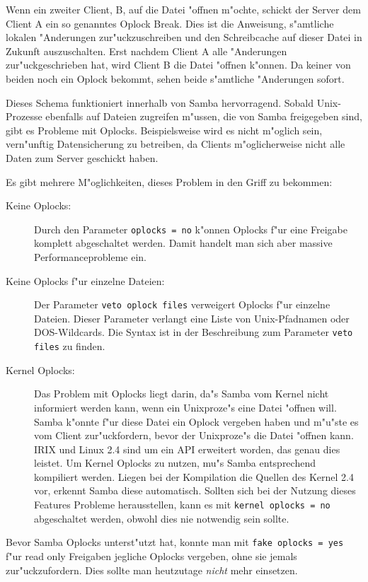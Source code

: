 \documentclass{scrartcl}\usepackage{pslatex}\typearea{12}
\newcommand{\param}{\texttt}
\begin{document}
Wenn ein zweiter Client, B, auf die Datei "offnen m"ochte, schickt der
Server dem Client A ein so genanntes Oplock Break. Dies ist die
Anweisung, s"amtliche lokalen "Anderungen zur"uckzuschreiben und den
Schreibcache auf dieser Datei in Zukunft auszuschalten. Erst nachdem
Client A alle "Anderungen zur"uckgeschrieben hat, wird Client B die
Datei "offnen k"onnen. Da keiner von beiden noch ein Oplock bekommt,
sehen beide s"amtliche "Anderungen sofort.

Dieses Schema funktioniert innerhalb von Samba hervorragend. Sobald
Unix-Prozesse ebenfalls auf Dateien zugreifen m"ussen, die von Samba
freigegeben sind, gibt es Probleme mit Oplocks. Beispielsweise wird es
nicht m"oglich sein, vern"unftig Datensicherung zu betreiben, da
Clients m"oglicherweise nicht alle Daten zum Server geschickt haben.

Es gibt mehrere M"oglichkeiten, dieses Problem in den Griff zu
bekommen:

\begin{description}
\item[Keine Oplocks:] Durch den Parameter \param{oplocks = no} k"onnen
  Oplocks f"ur eine Freigabe komplett abgeschaltet werden. Damit
  handelt man sich aber massive Performanceprobleme ein.
\item[Keine Oplocks f"ur einzelne Dateien:] Der Parameter \param{veto
    oplock files} verweigert Oplocks f"ur einzelne Dateien. Dieser
  Parameter verlangt eine Liste von Unix-Pfadnamen oder
  DOS-Wild\-cards. Die Syntax ist in der Beschreibung zum Parameter
  \param{veto files} zu finden.
\item[Kernel Oplocks:] Das Problem mit Oplocks liegt darin, da"s Samba
  vom Kernel nicht informiert werden kann, wenn ein Unixproze"s eine
  Datei "offnen will. Samba k"onnte f"ur diese Datei ein Oplock
  vergeben haben und m"u"ste es vom Client zur"uckfordern, bevor der
  Unixproze"s die Datei "offnen kann. IRIX und Linux 2.4 sind um ein
  API erweitert worden, das genau dies leistet. Um Kernel Oplocks zu
  nutzen, mu"s Samba entsprechend kompiliert werden. Liegen bei der
  Kompilation die Quellen des Kernel 2.4 vor, erkennt Samba diese
  automatisch. Sollten sich bei der Nutzung dieses Features Probleme
  herausstellen, kann es mit \param{kernel oplocks = no} abgeschaltet
  werden, obwohl dies nie notwendig sein sollte.
\end{description}

Bevor Samba Oplocks unterst"utzt hat, konnte man mit \param{fake
  oplocks = yes} f"ur read only Freigaben jegliche Oplocks vergeben,
ohne sie jemals zur"uckzufordern. Dies sollte man heutzutage
\emph{nicht} mehr einsetzen.
\end{document}
